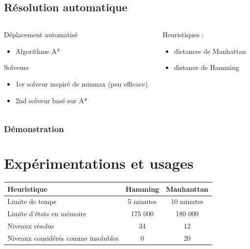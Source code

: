 \documentclass{beamer}
\begin{document}
\subsection{Résolution automatique}
\begin{frame}
\begin{columns}
\begin{column}{5cm}
Déplacement automatisé
\begin{itemize}
\item Algorithme A*
\end{itemize}
Solveurs
\begin{itemize}
\item 1er solveur inspiré de minmax (peu efficace)
\item 2nd solveur basé sur A*
\end{itemize}
\end{column}
\begin{column}{5cm}
Heuristiques :
\begin{itemize}
\item distances de Manhattan
\item distance de Hamming
\end{itemize}
\end{column}
\end{columns}
\end{frame}

\begin{frame}
\frametitle{Démonstration}
\end{frame}

\section{Expérimentations et usages}
\begin{frame}
  \centering
  \begin{tabular}{|l|c|c|}
  Heuristique                          & Hamming   & Manhanttan \\
  \hline
  Limite de temps                      & 5 minutes & 10 minutes \\
  \hline
  Limite d'états en mémoire            & 175 000   & 180 000    \\
  \hline
  Niveaux résolus                      &    34     &    12      \\
  \hline
  Niveaux considérés comme insolubles  &    0      &    20      \\
  \end{tabular}
\end{frame}
\end{document}
